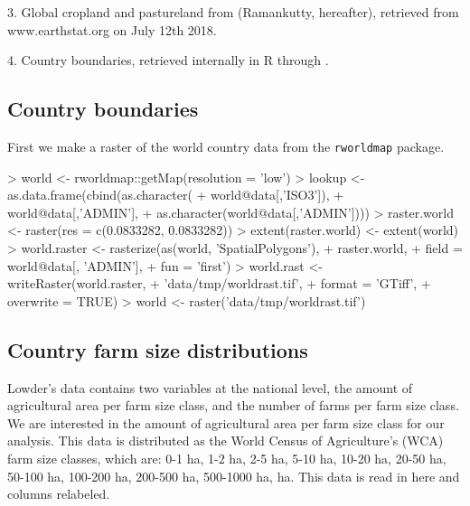 \documentclass{article}
\begin{document}
3. Global cropland and pastureland from \cite{Ramankutty} (Ramankutty, hereafter), retrieved from www.earthstat.org on July 12th 2018.

4. Country boundaries, retrieved internally in R through \cite{R-rworldmap}.


\subsection{Country boundaries}

First we make a raster of the world country data from the \texttt{rworldmap} package.
\begin{Schunk}
\begin{Sinput}
> world  <- rworldmap::getMap(resolution = 'low')
> lookup <- as.data.frame(cbind(as.character(
+   world@data[,'ISO3']),
+   world@data[,'ADMIN'],
+   as.character(world@data[,'ADMIN'])))
> raster.world <- raster(res = c(0.0833282, 0.0833282))
> extent(raster.world) <- extent(world)
> world.raster <- rasterize(as(world, 'SpatialPolygons'), 
+                           raster.world,
+                           field = world@data[, 'ADMIN'],
+                           fun   = 'first')
> world.rast <- writeRaster(world.raster, 
+                           'data/tmp/worldrast.tif', 
+                           format    = 'GTiff', 
+                           overwrite = TRUE)
> world  <- raster('data/tmp/worldrast.tif')
\end{Sinput}
\end{Schunk}

\subsection{Country farm size distributions}

Lowder's data contains two variables at the national level, the amount of agricultural area per farm size class, and the number of farms per farm size class. We are interested in the amount of agricultural area per farm size class for our analysis. This data is distributed as the World Census of Agriculture's (WCA) farm size classes, which are: 0-1 ha, 1-2 ha, 2-5 ha, 5-10 ha, 10-20 ha, 20-50 ha, 50-100 ha, 100-200 ha, 200-500 ha, 500-1000 ha,  ha. This data is read in here and columns relabeled.
\end{document}
